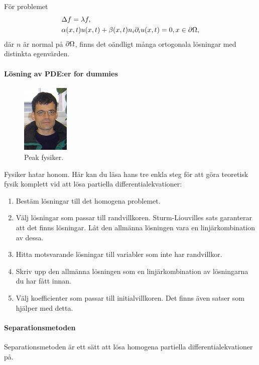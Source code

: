 För problemet
\begin{align*}
	&\Delta f = \lambda f, \\
	&\alpha(x, t)u(x, t) + \beta(x, t)n_{i}\partial_{i}u(x, t) = 0, x\in\partial \Omega,
\end{align*}
där $n$ är normal på $\partial \Omega$, finns det oändligt många ortogonala lösningar med distinkta egenvärden.

\paragraph{Lösning av PDE:er for dummies}
\begin{figure}[!ht]
	\centering
	\includegraphics[width = 0.2\textwidth]{./Images/langmann.jpg}
	\caption{Peak fysiker.}
	\label{fig:langmann}
\end{figure}
Fysiker hatar honom. Här kan du läsa hans tre enkla steg för att göra teoretisk fysik komplett vid att lösa partiella differentialekvationer:
\begin{enumerate}
	\item Bestäm lösningar till det homogena problemet.
	\item Välj lösningar som passar till randvillkoren. Sturm-Liouvilles sats garanterar att det finns lösningar. Låt den allmänna lösningen vara en linjärkombination av dessa.
	\item Hitta motsvarande lösningar till variabler som inte har randvillkor.
	\item Skriv upp den allmänna lösningen som en linjärkombination av lösningarna du har fått innan.
	\item Välj koefficienter som passar till initialvillkoren. Det finns även satser som hjälper med detta.
\end{enumerate}

\paragraph{Separationsmetoden}
Separationsmetoden är ett sätt att lösa homogena partiella differentialekvationer på.

